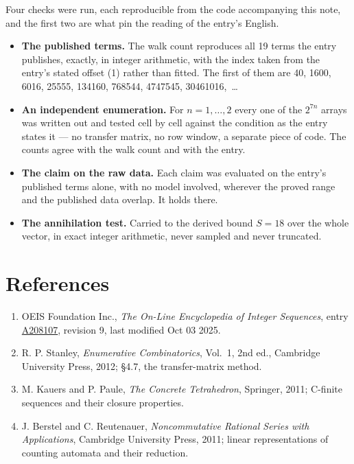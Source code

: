 \documentclass[11pt]{article}
\theoremstyle{definition}
\begin{document}
Four checks were run, each reproducible from the code accompanying this note, and the first two are what pin the reading of the entry's English.

\begin{itemize}

\item {\bfseries The published terms.} The walk count reproduces all 19 terms the entry publishes, exactly, in integer arithmetic, with the index taken from the entry's stated offset (1) rather than fitted. The first of them are 40, 1600, 6016, 25555, 134160, 768544, 4747545, 30461016,~\dots

\item {\bfseries An independent enumeration.} For $n = 1,\dots,2$ every one of the $2^{7n}$ arrays was written out and tested cell by cell against the condition as the entry states it --- no transfer matrix, no row window, a separate piece of code. The counts agree with the walk count and with the entry.

\item {\bfseries The claim on the raw data.} Each claim was evaluated on the entry's published terms alone, with no model involved, wherever the proved range and the published data overlap. It holds there.

\item {\bfseries The annihilation test.} Carried to the derived bound $S = 18$ over the whole vector, in exact integer arithmetic, never sampled and never truncated.

\end{itemize}

\section{References}

\begin{enumerate}

\item OEIS Foundation Inc., \emph{The On-Line Encyclopedia of Integer Sequences}, entry \href{https://oeis.org/A208107}{A208107}, revision 9, last modified Oct 03 2025.

\item R. P. Stanley, \emph{Enumerative Combinatorics}, Vol.~1, 2nd ed., Cambridge University Press, 2012; \S4.7, the transfer-matrix method.

\item M. Kauers and P. Paule, \emph{The Concrete Tetrahedron}, Springer, 2011; C-finite sequences and their closure properties.

\item J. Berstel and C. Reutenauer, \emph{Noncommutative Rational Series with Applications}, Cambridge University Press, 2011; linear representations of counting automata and their reduction.

\end{enumerate}
\end{document}
